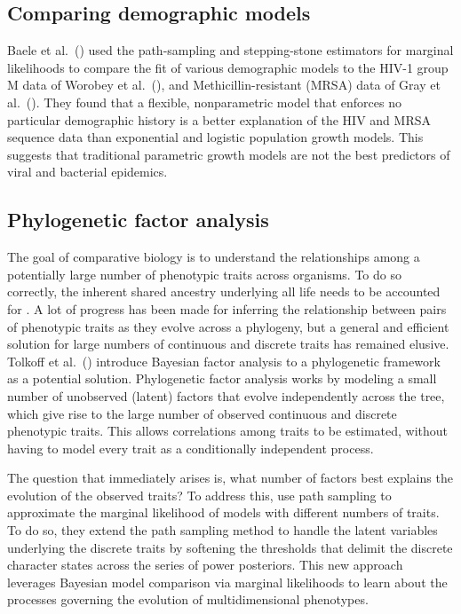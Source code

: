 \subsection{Comparing demographic models}

Baele et al.\ (\citeyear{Baele2012}) used the path-sampling and stepping-stone
estimators for marginal likelihoods to compare the fit of various demographic
models to the HIV-1 group M data of Worobey et al.\ (\citeyear{Worobey2008}),
and Methicillin-resistant  (MRSA)  data of Gray et
al.\ (\citeyear{Gray2011}).
They found that a flexible, nonparametric model that enforces no particular
demographic history is a better explanation of the HIV and MRSA sequence data
than exponential and logistic population growth models.
This suggests that traditional parametric growth models are not the best
predictors of viral and bacterial epidemics.



\subsection{Phylogenetic factor analysis}

The goal of comparative biology is to understand the relationships among a
potentially large number of phenotypic traits across organisms. 
To do so correctly, the inherent shared ancestry underlying all life needs to
be accounted for \citep{Felsenstein1985PIC}.
A lot of progress has been made for inferring the relationship between pairs
of phenotypic traits as they evolve across a phylogeny,
but a general and efficient solution for large numbers of continuous
and discrete traits has remained elusive.
Tolkoff et al.\ (\citeyear{Tolkoff2017}) introduce Bayesian factor analysis to
a phylogenetic framework as a potential solution.
Phylogenetic factor analysis works by modeling a small number of unobserved
(latent) factors that evolve independently across the tree, which give rise to
the large number of observed continuous and discrete phenotypic traits.
This allows correlations among traits to be estimated, without having to model
every trait as a conditionally independent process.

The question that immediately arises is, what number of factors best explains
the evolution of the observed traits?
To address this, \citep{Tolkoff2017} use path sampling to approximate the
marginal likelihood of models with different numbers of traits.
To do so, they extend the path sampling method to handle the latent variables
underlying the discrete traits by softening the thresholds that delimit the
discrete character states across the series of power posteriors.
This new approach leverages Bayesian model comparison via marginal likelihoods
to learn about the processes governing the evolution of multidimensional
phenotypes.


